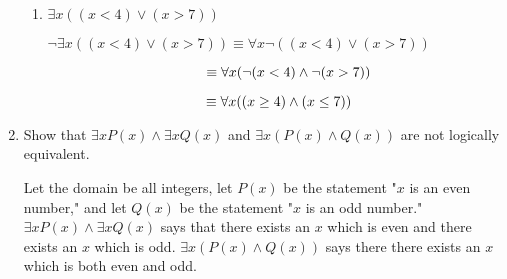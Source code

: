 \documentclass[11pt]{article}
\begin{document}
\begin{enumerate}[label=\textbf{\arabic*.}]
\begin{enumerate}[label=\textbf{\alph*)}]
		\item $\exists x((x < 4) \lor (x > 7))$
		
		$\neg\exists x((x < 4) \lor (x > 7)) \equiv \forall x\neg((x < 4) \lor (x > 7))$
		
		$\hspace{3.96cm}\equiv \forall x(\neg(x < 4) \land \neg(x > 7))$
		
		$\hspace{3.96cm}\equiv \forall x((x \geq 4) \land (x \leq 7))$
	\end{enumerate}

	\item Show that $\exists xP(x) \land \exists xQ(x)$ and $\exists x(P(x) \land Q(x))$ are not logically equivalent.
	
	Let the domain be all integers, let $P(x)$ be the statement "$x$ is an even number," and let $Q(x)$ be the statement "$x$ is an odd number." $\exists xP(x) \land \exists xQ(x)$ says that there exists an $x$ which is even and there exists an $x$ which is odd. $\exists x(P(x) \land Q(x))$ says there there exists an $x$ which is both even and odd.
\end{enumerate}
\end{document}
